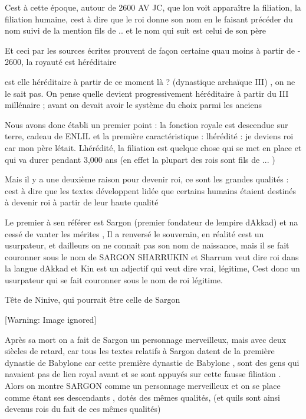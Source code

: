 \documentclass{article}
\begin{document}
C{\textquotesingle}est à cette époque, autour de 2600 AV JC, que
l{\textquotesingle}on voit apparaître la filiation, la filiation
humaine, c{\textquotesingle}est à dire que le roi donne son nom en le
faisant précéder du nom suivi de la mention {\textquotedbl} fils de ..
{\textquotedbl} et le nom qui suit est celui de son père

Et ceci par les sources écrites prouvent de façon certaine
qu{\textquotesingle}au moins à partir de - 2600, la royauté est
héréditaire

est elle héréditaire à partir de ce moment là ? (dynastique archaïque
III) , on  ne le sait pas. On pense qu{\textquotesingle}elle devient
progressivement héréditaire à partir du III millénaire ; avant on
devait avoir le système du choix parmi les anciens

Nous avons donc établi un premier point : la fonction royale est
descendue sur terre, cadeau de ENLIL et la première caractéristique  :
l{\textquotesingle}hérédité : je deviens roi car mon père
l{\textquotesingle}était. L{\textquotesingle}hérédité, la filiation est
quelque chose qui se met en  place et qui va durer pendant 3,000 ans
(en effet la plupart des rois sont fils de ... )

Mais il y a une deuxième raison pour devenir roi, ce sont les grandes
qualités : c{\textquotesingle}est à dire que les textes développent
l{\textquotesingle}idée que certains humains étaient destinés à devenir
roi à partir de leur haute qualité 

Le premier à s{\textquotesingle}en référer est Sargon (premier fondateur
de l{\textquotesingle}empire d{\textquotesingle}Akkad) et
n{\textquotesingle}a cessé de vanter les mérites , Il a renversé le
souverain, en réalité c{\textquotesingle}est un usurpateur, et
d{\textquotesingle}ailleurs on ne connait pas son nom de naissance,
mais il se fait couronner sous le nom de SARGON SHARRUKIN et Sharrum
veut dire roi dans la langue d{\textquotesingle}Akkad et Kin est un
adjectif qui veut dire vrai, légitime,  C{\textquotesingle}est donc un
usurpateur qui se fait couronner sous le nom de roi légitime.

Tête de Ninive, qui pourrait être celle de Sargon

  [Warning: Image ignored] %
 

Après sa mort on a fait de Sargon un personnage merveilleux, mais avec
deux siècles de retard, car tous les textes relatifs à Sargon datent de
la première dynastie de Babylone car cette première dynastie de
Babylone , sont des gens qui n{\textquotesingle}avaient pas de lien
royal avant et se sont appuyés sur cette fausse filiation . Alors on
montre SARGON comme un personnage merveilleux et on se place comme
étant ses descendants , dotés des mêmes qualités, (et
qu{\textquotesingle}ils sont ainsi devenus rois du fait de ces mêmes
qualités)
\end{document}
